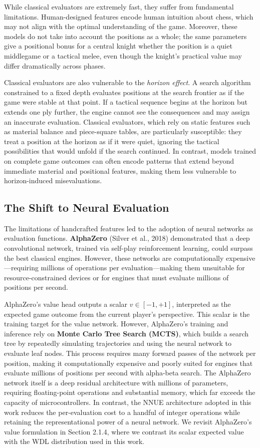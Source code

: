 While classical evaluators are extremely fast, they suffer from fundamental limitations. Human-designed features encode human intuition about chess, which may not align with the optimal understanding of the game. Moreover, these models do not take into account the positions as a whole; the same parameters give a positional bonus for a central knight whether the position is a quiet middlegame or a tactical melee, even though the knight's practical value may differ dramatically across phases.

Classical evaluators are also vulnerable to the \emph{horizon effect}. A search algorithm constrained to a fixed depth evaluates positions at the search frontier as if the game were stable at that point. If a tactical sequence begins at the horizon but extends one ply further, the engine cannot see the consequences and may assign an inaccurate evaluation. Classical evaluators, which rely on static features such as material balance and piece-square tables, are particularly susceptible: they treat a position at the horizon as if it were quiet, ignoring the tactical possibilities that would unfold if the search continued. In contrast, models trained on complete game outcomes can often encode patterns that extend beyond immediate material and positional features, making them less vulnerable to horizon-induced misevaluations.


\subsection{The Shift to Neural Evaluation}

The limitations of handcrafted features led to the adoption of neural networks as evaluation functions. \textbf{AlphaZero} (Silver et al., 2018) demonstrated that a deep convolutional network, trained via self-play reinforcement learning, could surpass the best classical engines. However, these networks are computationally expensive---requiring millions of operations per evaluation---making them unsuitable for resource-constrained devices or for engines that must evaluate millions of positions per second.

AlphaZero's value head outputs a scalar $v\in[-1,+1]$, interpreted as the expected game outcome from the current player's perspective. This scalar is the training target for the value network. However, AlphaZero's training and inference rely on \textbf{Monte Carlo Tree Search (MCTS)}, which builds a search tree by repeatedly simulating trajectories and using the neural network to evaluate leaf nodes. This process requires many forward passes of the network per position, making it computationally expensive and poorly suited for engines that evaluate millions of positions per second with alpha-beta search. The AlphaZero network itself is a deep residual architecture with millions of parameters, requiring floating-point operations and substantial memory, which far exceeds the capacity of microcontrollers. In contrast, the NNUE architecture adopted in this work reduces the per-evaluation cost to a handful of integer operations while retaining the representational power of a neural network. We revisit AlphaZero's value formulation in Section 2.1.4, where we contrast its scalar expected value with the WDL distribution used in this work.

